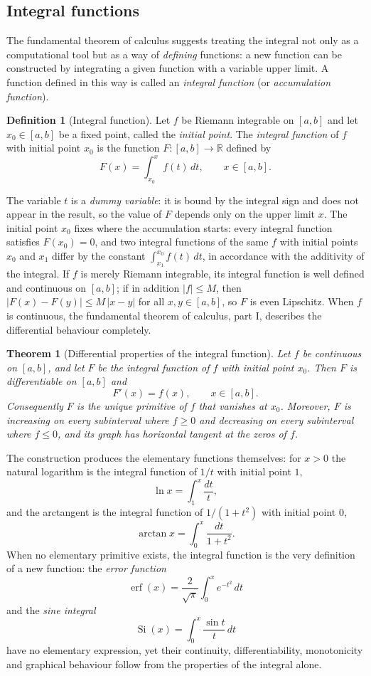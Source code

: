 \documentclass[11pt,a4paper]{article}
\theoremstyle{definition} \newtheorem{definition}{Definition} \theoremstyle{plain} \newtheorem{theorem}{Theorem}
\begin{document}
\subsection{Integral functions}
The fundamental theorem of calculus suggests treating the integral not only as a computational tool but as a way of \emph{defining} functions: a new function can be constructed by integrating a given function with a variable upper limit.
A function defined in this way is called an \emph{integral function} (or \emph{accumulation function}).
\begin{definition}[Integral function] Let $f$ be Riemann integrable on $[a,b]$ and let $x_0\in[a,b]$ be a fixed point, called the \emph{initial point}.
The \emph{integral function} of $f$ with initial point $x_0$ is the function $F:[a,b]\to\mathbb{R}$ defined by \[ F(x) = \int_{x_0}^{x} f(t)\,dt, \qquad x\in[a,b]. \] \end{definition}
The variable $t$ is a \emph{dummy variable}: it is bound by the integral sign and does not appear in the result, so the value of $F$ depends only on the upper limit $x$.
The initial point $x_0$ fixes where the accumulation starts: every integral function satisfies $F(x_0)=0$, and two integral functions of the same $f$ with initial points $x_0$ and $x_1$ differ by the constant $\int_{x_1}^{x_0} f(t)\,dt$, in accordance with the additivity of the integral.
If $f$ is merely Riemann integrable, its integral function is well defined and continuous on $[a,b]$; if in addition $|f|\le M$, then $|F(x)-F(y)|\le M\,|x-y|$ for all $x,y\in[a,b]$, so $F$ is even Lipschitz.
When $f$ is continuous, the fundamental theorem of calculus, part I, describes the differential behaviour completely.
\begin{theorem}[Differential properties of the integral function]\label{thm:differential-integral} Let $f$ be continuous on $[a,b]$, and let $F$ be the integral function of $f$ with initial point $x_0$.
Then $F$ is differentiable on $[a,b]$ and \[ F'(x) = f(x), \qquad x\in[a,b]. \] Consequently $F$ is the unique primitive of $f$ that vanishes at $x_0$.
Moreover, $F$ is increasing on every subinterval where $f\ge 0$ and decreasing on every subinterval where $f\le 0$, and its graph has horizontal tangent at the zeros of $f$. \end{theorem}
The construction produces the elementary functions themselves: for $x>0$ the natural logarithm is the integral function of $1/t$ with initial point $1$, \[ \ln x = \int_1^x \frac{dt}{t}, \] and the arctangent is the integral function of $1/(1+t^2)$ with initial point $0$, \[ \arctan x = \int_0^x \frac{dt}{1+t^2}. \]
When no elementary primitive exists, the integral function is the very definition of a new function: the \emph{error function} \[ \operatorname{erf}(x) = \frac{2}{\sqrt{\pi}}\int_0^x e^{-t^2}\,dt \] and the \emph{sine integral} \[ \operatorname{Si}(x) = \int_0^x \frac{\sin t}{t}\,dt \] have no elementary expression, yet their continuity, differentiability, monotonicity and graphical behaviour follow from the properties of the integral alone.
\end{document}
